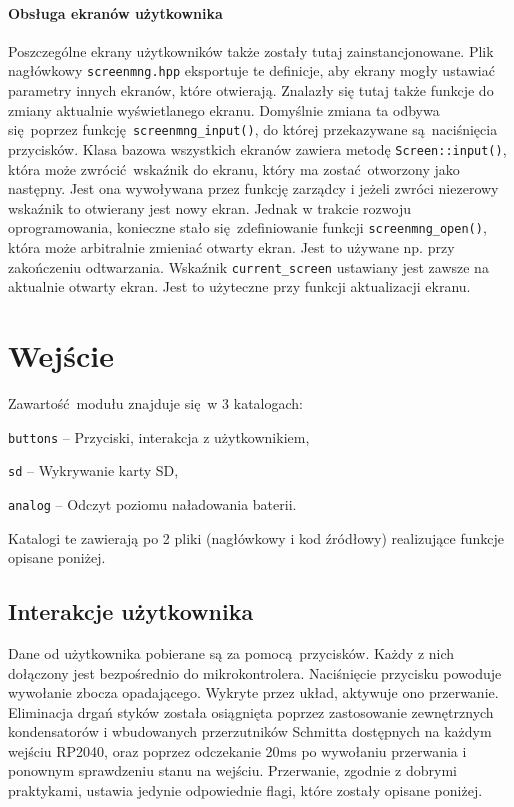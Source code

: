 \documentclass[12pt]{report}
\let\tempone\itemize
\let\temptwo\enditemize
\renewenvironment{itemize}{\tempone\setlength{\itemsep}{0cm}}{\temptwo}
\begin{document}
			\paragraph{Obsługa ekranów użytkownika}
				Poszczególne ekrany użytkowników także zostały tutaj zainstancjonowane. Plik nagłówkowy \lstinline|screenmng.hpp| eksportuje te definicje, aby ekrany mogły ustawiać parametry innych ekranów, które otwierają. Znalazły się tutaj także funkcje do zmiany aktualnie wyświetlanego ekranu. Domyślnie zmiana ta odbywa się poprzez funkcję \lstinline|screenmng_input()|, do której przekazywane są naciśnięcia przycisków. Klasa bazowa wszystkich ekranów zawiera metodę \lstinline|Screen::input()|, która może zwrócić wskaźnik do ekranu, który ma zostać otworzony jako następny. Jest ona wywoływana przez funkcję zarządcy i jeżeli zwróci niezerowy wskaźnik to otwierany jest nowy ekran. Jednak w trakcie rozwoju oprogramowania, konieczne stało się zdefiniowanie funkcji \lstinline|screenmng_open()|, która może arbitralnie zmieniać otwarty ekran. Jest to używane np. przy zakończeniu odtwarzania. Wskaźnik \lstinline|current_screen| ustawiany jest zawsze na aktualnie otwarty ekran. Jest to użyteczne przy funkcji aktualizacji ekranu.

	\section{Wejście}
		\noindent
		Zawartość modułu znajduje się w 3 katalogach:
		\begin{itemize}
			\item \lstinline|buttons| -- Przyciski, interakcja z użytkownikiem,
			\item \lstinline|sd| -- Wykrywanie karty SD,
			\item \lstinline|analog| -- Odczyt poziomu naładowania baterii.
		\end{itemize}
		
		Katalogi te zawierają po 2 pliki (nagłówkowy i kod źródłowy) realizujące funkcje opisane poniżej.
		
		\subsection{Interakcje użytkownika}
			Dane od użytkownika pobierane są za pomocą przycisków. Każdy z nich dołączony jest bezpośrednio do mikrokontrolera. Naciśnięcie przycisku powoduje wywołanie zbocza opadającego. Wykryte przez układ, aktywuje ono przerwanie. Eliminacja drgań styków została osiągnięta poprzez zastosowanie zewnętrznych kondensatorów i wbudowanych przerzutników Schmitta dostępnych na każdym wejściu RP2040, oraz poprzez odczekanie 20ms po wywołaniu przerwania i ponownym sprawdzeniu stanu na wejściu. Przerwanie, zgodnie z dobrymi praktykami, ustawia jedynie odpowiednie flagi, które zostały opisane poniżej.
			
\end{document}
